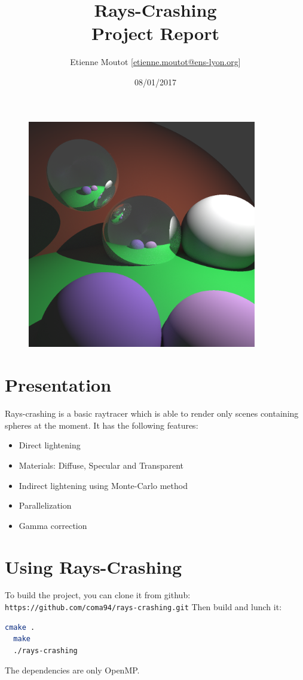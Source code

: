 \documentclass[11pt]{article}
\title{\vspace{-8ex}
\huge Rays-Crashing\\
{\normalsize Project Report}}
\author{Etienne Moutot [\href{mailto:etienne.moutot@ens-lyon.org}{etienne.moutot@ens-lyon.org}]}
\date{08/01/2017}
\begin{document}
\maketitle

\begin{figure}[h]
\centering
\includegraphics[width=10cm]{img/ex_1000.png}
\end{figure}

\section{Presentation}
Rays-crashing is a basic raytracer which is able to render only scenes containing spheres at the moment. It has the following features:
\begin{itemize}
  \item Direct lightening
  \item Materials: Diffuse, Specular and Transparent
  \item Indirect lightening using Monte-Carlo method
  \item Parallelization
  \item Gamma correction
\end{itemize}

\section{Using Rays-Crashing}
To build the project, you can clone it from github: \texttt{https://github.com/coma94/rays-crashing.git}
Then build and lunch it:
\begin{lstlisting}[language=bash]
  cmake .
  make
  ./rays-crashing
\end{lstlisting}
The dependencies are only OpenMP.
\end{document}
